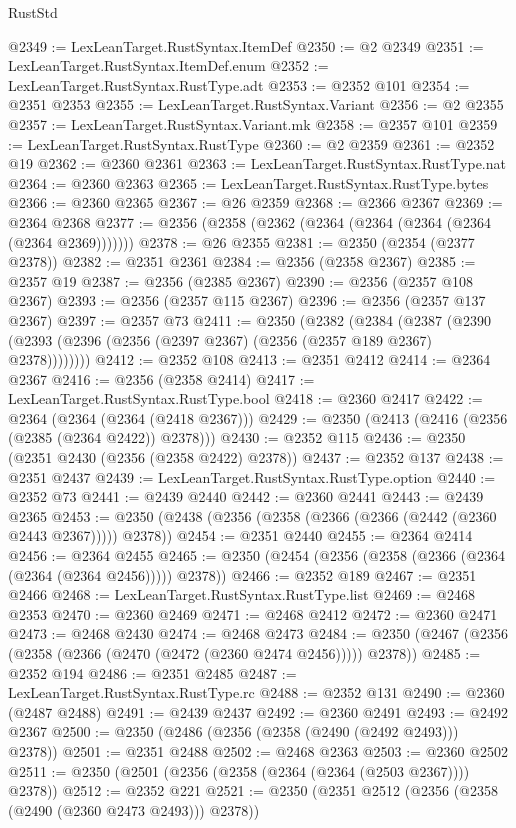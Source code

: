 \begin{lexlean}{RustStd}
\begin{coremodule}
@2349 := LexLeanTarget.RustSyntax.ItemDef
@2350 := @2 @2349
@2351 := LexLeanTarget.RustSyntax.ItemDef.enum
@2352 := LexLeanTarget.RustSyntax.RustType.adt
@2353 := @2352 @101
@2354 := @2351 @2353
@2355 := LexLeanTarget.RustSyntax.Variant
@2356 := @2 @2355
@2357 := LexLeanTarget.RustSyntax.Variant.mk
@2358 := @2357 @101
@2359 := LexLeanTarget.RustSyntax.RustType
@2360 := @2 @2359
@2361 := @2352 @19
@2362 := @2360 @2361
@2363 := LexLeanTarget.RustSyntax.RustType.nat
@2364 := @2360 @2363
@2365 := LexLeanTarget.RustSyntax.RustType.bytes
@2366 := @2360 @2365
@2367 := @26 @2359
@2368 := @2366 @2367
@2369 := @2364 @2368
@2377 := @2356 (@2358 (@2362 (@2364 (@2364 (@2364 (@2364 (@2364 @2369)))))))
@2378 := @26 @2355
@2381 := @2350 (@2354 (@2377 @2378))
@2382 := @2351 @2361
@2384 := @2356 (@2358 @2367)
@2385 := @2357 @19
@2387 := @2356 (@2385 @2367)
@2390 := @2356 (@2357 @108 @2367)
@2393 := @2356 (@2357 @115 @2367)
@2396 := @2356 (@2357 @137 @2367)
@2397 := @2357 @73
@2411 := @2350
    (@2382
      (@2384
        (@2387 (@2390 (@2393 (@2396 (@2356 (@2397 @2367) (@2356 (@2357 @189 @2367) @2378))))))))
@2412 := @2352 @108
@2413 := @2351 @2412
@2414 := @2364 @2367
@2416 := @2356 (@2358 @2414)
@2417 := LexLeanTarget.RustSyntax.RustType.bool
@2418 := @2360 @2417
@2422 := @2364 (@2364 (@2364 (@2418 @2367)))
@2429 := @2350 (@2413 (@2416 (@2356 (@2385 (@2364 @2422)) @2378)))
@2430 := @2352 @115
@2436 := @2350 (@2351 @2430 (@2356 (@2358 @2422) @2378))
@2437 := @2352 @137
@2438 := @2351 @2437
@2439 := LexLeanTarget.RustSyntax.RustType.option
@2440 := @2352 @73
@2441 := @2439 @2440
@2442 := @2360 @2441
@2443 := @2439 @2365
@2453 := @2350 (@2438 (@2356 (@2358 (@2366 (@2366 (@2442 (@2360 @2443 @2367))))) @2378))
@2454 := @2351 @2440
@2455 := @2364 @2414
@2456 := @2364 @2455
@2465 := @2350 (@2454 (@2356 (@2358 (@2366 (@2364 (@2364 (@2364 @2456))))) @2378))
@2466 := @2352 @189
@2467 := @2351 @2466
@2468 := LexLeanTarget.RustSyntax.RustType.list
@2469 := @2468 @2353
@2470 := @2360 @2469
@2471 := @2468 @2412
@2472 := @2360 @2471
@2473 := @2468 @2430
@2474 := @2468 @2473
@2484 := @2350 (@2467 (@2356 (@2358 (@2366 (@2470 (@2472 (@2360 @2474 @2456))))) @2378))
@2485 := @2352 @194
@2486 := @2351 @2485
@2487 := LexLeanTarget.RustSyntax.RustType.rc
@2488 := @2352 @131
@2490 := @2360 (@2487 @2488)
@2491 := @2439 @2437
@2492 := @2360 @2491
@2493 := @2492 @2367
@2500 := @2350 (@2486 (@2356 (@2358 (@2490 (@2492 @2493))) @2378))
@2501 := @2351 @2488
@2502 := @2468 @2363
@2503 := @2360 @2502
@2511 := @2350 (@2501 (@2356 (@2358 (@2364 (@2364 (@2503 @2367)))) @2378))
@2512 := @2352 @221
@2521 := @2350 (@2351 @2512 (@2356 (@2358 (@2490 (@2360 @2473 @2493))) @2378))

\end{coremodule}
\end{lexlean}
